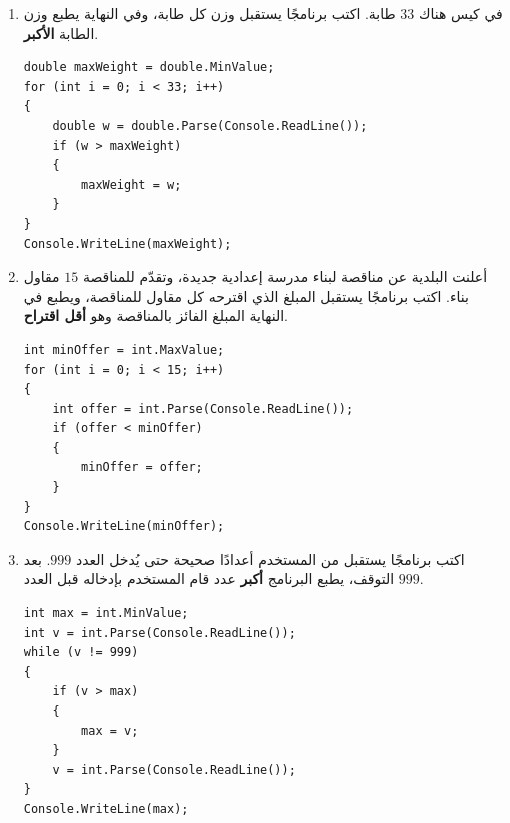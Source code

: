 \documentclass[14pt]{extarticle}
\begin{document}
\begin{enumerate}[resume, itemsep=1em]

\item في كيس هناك $33$ طابة. اكتب برنامجًا يستقبل وزن كل طابة، وفي النهاية يطبع وزن الطابة \textbf{الأكبر}.
\ifwithsols
\begin{boxSolution}
\begin{english}
\begin{verbatim}
double maxWeight = double.MinValue;
for (int i = 0; i < 33; i++)
{
    double w = double.Parse(Console.ReadLine());
    if (w > maxWeight)
    {
        maxWeight = w;
    }
}
Console.WriteLine(maxWeight);
\end{verbatim}
\end{english}
\end{boxSolution}
\fi
\filbreak

\item أعلنت البلدية عن مناقصة لبناء مدرسة إعدادية جديدة، وتقدّم للمناقصة $15$ مقاول بناء. اكتب برنامجًا يستقبل المبلغ الذي اقترحه كل مقاول للمناقصة، ويطبع في النهاية المبلغ الفائز بالمناقصة وهو \textbf{أقل اقتراح}.
\ifwithsols
\begin{boxSolution}
\begin{english}
\begin{verbatim}
int minOffer = int.MaxValue;
for (int i = 0; i < 15; i++)
{
    int offer = int.Parse(Console.ReadLine());
    if (offer < minOffer)
    {
        minOffer = offer;
    }
}
Console.WriteLine(minOffer);
\end{verbatim}
\end{english}
\end{boxSolution}
\fi
\filbreak

\item اكتب برنامجًا يستقبل من المستخدم أعدادًا صحيحة حتى يُدخل العدد $999$. بعد التوقف، يطبع البرنامج \textbf{أكبر} عدد قام المستخدم بإدخاله قبل العدد $999$.
\ifwithsols
\begin{boxSolution}
\begin{english}
\begin{verbatim}
int max = int.MinValue;
int v = int.Parse(Console.ReadLine());
while (v != 999)
{
    if (v > max)
    {
        max = v;
    }
    v = int.Parse(Console.ReadLine());
}
Console.WriteLine(max);
\end{verbatim}
\end{english}
\end{boxSolution}
\fi
\filbreak


\end{enumerate}
\end{document}
